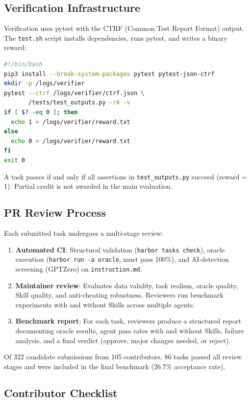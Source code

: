 \subsection{Verification Infrastructure}

Verification uses pytest with the CTRF (Common Test Report Format) output. The \texttt{test.sh} script installs dependencies, runs pytest, and writes a binary reward:

\begin{lstlisting}[language=bash,basicstyle=\footnotesize\ttfamily]
#!/bin/bash
pip3 install --break-system-packages pytest pytest-json-ctrf
mkdir -p /logs/verifier
pytest --ctrf /logs/verifier/ctrf.json \
       /tests/test_outputs.py -rA -v
if [ $? -eq 0 ]; then
  echo 1 > /logs/verifier/reward.txt
else
  echo 0 > /logs/verifier/reward.txt
fi
exit 0
\end{lstlisting}

\noindent A task passes if and only if all assertions in \texttt{test\_outputs.py} succeed (reward = 1). Partial credit is not awarded in the main evaluation.

\subsection{PR Review Process}

Each submitted task undergoes a multi-stage review:
\begin{enumerate}[nosep]
\item \textbf{Automated CI}: Structural validation (\texttt{harbor tasks check}), oracle execution (\texttt{harbor run -a oracle}, must pass 100\%), and AI-detection screening (GPTZero) on \texttt{instruction.md}.
\item \textbf{Maintainer review}: Evaluates data validity, task realism, oracle quality, Skill quality, and anti-cheating robustness. Reviewers run benchmark experiments with and without Skills across multiple agents.
\item \textbf{Benchmark report}: For each task, reviewers produce a structured report documenting oracle results, agent pass rates with and without Skills, failure analysis, and a final verdict (approve, major changes needed, or reject).
\end{enumerate}

\noindent Of 322 candidate submissions from 105 contributors, 86 tasks passed all review stages and were included in the final benchmark (26.7\% acceptance rate).

\subsection{Contributor Checklist}

